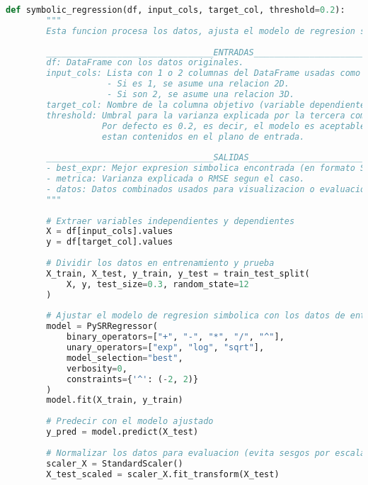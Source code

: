 \documentclass[11pt, a4paper]{article} %
\begin{document}
\begin{lstlisting}[language=Python, caption=Implementación del modelo de regresión simbólica, basicstyle=\tiny,label=lst:foo]
    def symbolic_regression(df, input_cols, target_col, threshold=0.2):
        """
        Esta funcion procesa los datos, ajusta el modelo de regresion simbolica (SR) y cuantifica su ajuste.
    
        _________________________________ENTRADAS________________________________
        df: DataFrame con los datos originales.
        input_cols: Lista con 1 o 2 columnas del DataFrame usadas como variables independientes.
                    - Si es 1, se asume una relacion 2D.
                    - Si son 2, se asume una relacion 3D.
        target_col: Nombre de la columna objetivo (variable dependiente).
        threshold: Umbral para la varianza explicada por la tercera componente (en caso 3D).
                   Por defecto es 0.2, es decir, el modelo es aceptable si el 80% de los datos
                   estan contenidos en el plano de entrada.
    
        _________________________________SALIDAS________________________________
        - best_expr: Mejor expresion simbolica encontrada (en formato SymPy) si cumple el umbral.
        - metrica: Varianza explicada o RMSE segun el caso.
        - datos: Datos combinados usados para visualizacion o evaluacion.
        """
    
        # Extraer variables independientes y dependientes
        X = df[input_cols].values
        y = df[target_col].values
    
        # Dividir los datos en entrenamiento y prueba
        X_train, X_test, y_train, y_test = train_test_split(
            X, y, test_size=0.3, random_state=12
        )
    
        # Ajustar el modelo de regresion simbolica con los datos de entrenamiento
        model = PySRRegressor(
            binary_operators=["+", "-", "*", "/", "^"],
            unary_operators=["exp", "log", "sqrt"],
            model_selection="best",
            verbosity=0,
            constraints={'^': (-2, 2)}
        )
        model.fit(X_train, y_train)
    
        # Predecir con el modelo ajustado
        y_pred = model.predict(X_test)
    
        # Normalizar los datos para evaluacion (evita sesgos por escalas)
        scaler_X = StandardScaler()
        X_test_scaled = scaler_X.fit_transform(X_test)
    

\end{lstlisting}
\end{document}
